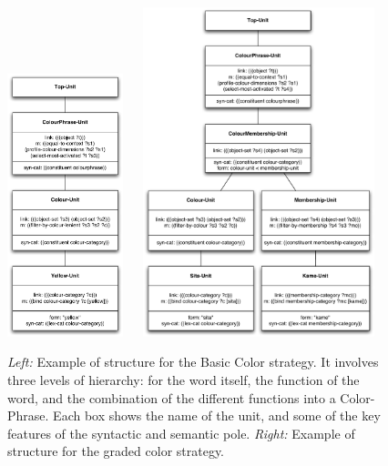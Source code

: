 \begin{figure}[htbp]
  \centerline{\includegraphics[width=0.3\textwidth]{chap11/figs/syntactic-basic} $~~~~$ 
\includegraphics[width=0.6\textwidth]{chap11/figs/syntactic-graded}}
\caption{\label{fig:syntactic-graded} 
{\itshape Left:} Example of structure for the Basic Color strategy. It involves three levels of hierarchy: for the word 
itself, the function of the word, and the combination of the different functions into a Color-Phrase. Each box 
shows the name of the unit, and some of the key features of the syntactic and semantic pole.
{\itshape Right:} Example of structure for the graded color strategy.}
\end{figure}

